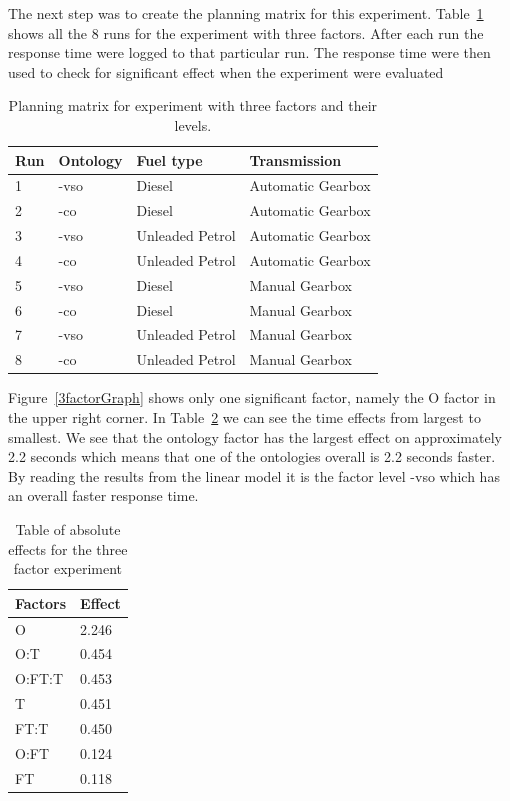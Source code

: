 \documentclass{llncs}
\begin{document}
The next step was to create the planning matrix for this
experiment. Table~\ref{3factor} shows all the 8 runs for the
experiment with three factors.  After each run the response time were
logged to that particular run. The response time were then used to
check for significant effect when the experiment were evaluated
\begin{table}
    \begin{tabular}{ | l | l l l |}
    \hline
    {\bf Run} & {\bf Ontology} & {\bf Fuel type} & {\bf Transmission} \\ \hline
	1 & -vso & Diesel & Automatic Gearbox \\ \hline 
	2 & -co & Diesel & Automatic Gearbox \\ \hline 
	3 & -vso & Unleaded Petrol & Automatic Gearbox \\ \hline 
	4 & -co & Unleaded Petrol & Automatic Gearbox \\ \hline 
	5 & -vso & Diesel & Manual Gearbox \\ \hline 
	6 & -co & Diesel & Manual Gearbox \\ \hline 
	7 & -vso & Unleaded Petrol & Manual Gearbox \\ \hline 
	8 & -co & Unleaded Petrol & Manual Gearbox \\ \hline 
    \end{tabular}
    \caption{Planning matrix for experiment with three factors and
      their levels.}\label{3factor}
\end{table}


Figure~\ref{3factorGraph}
shows only one significant factor, namely the \textsf{O} factor in the
upper right corner. In Table~\ref{3factorEffect}
we can see the time effects from largest to smallest.  We see that the
ontology factor has the largest effect on approximately 2.2 seconds
which means that one of the ontologies overall is 2.2 seconds
faster. By reading the results from the linear model it is the factor
level \textsf{-vso} which has an overall faster response time.

\begin{table}
    \begin{tabular}{ | l l |}
    \hline
    {\bf Factors} & {\bf Effect}  \\ \hline
	  O     & 2.246\\ \hline
	  O:T    &0.454 \\ \hline
	  O:FT:T &0.453 \\ \hline
	  T      &0.451 \\ \hline
	  FT:T   &0.450 \\ \hline
	  O:FT   &0.124 \\ \hline
	  FT     &0.118 \\ \hline
    \end{tabular}
\caption{Table of absolute effects for the three factor experiment}\label{3factorEffect}
\end{table} 
\end{document}
